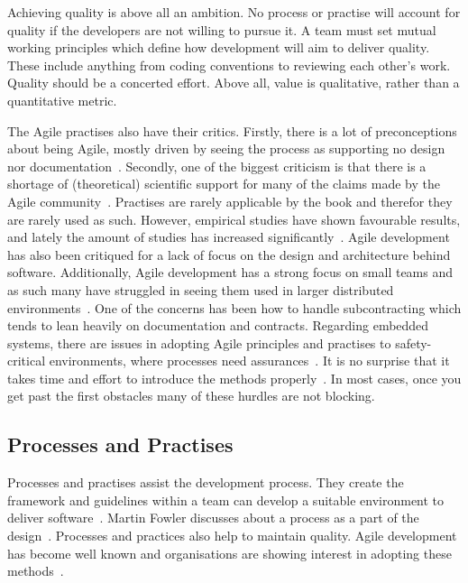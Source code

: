 \documentclass[english]{tktltiki2}
\begin{document}
Achieving quality is above all an ambition. No process or practise will account for quality if the developers are not willing to pursue it. A team must set mutual working principles which define how development will aim to deliver quality. These include anything from coding conventions to reviewing each other’s work. Quality should be a concerted effort. Above all, value is qualitative, rather than a quantitative metric.

The Agile practises also have their critics. Firstly, there is a lot of preconceptions about being Agile, mostly driven by seeing the process as supporting no design nor documentation~\cite{HMP12}. Secondly, one of the biggest criticism is that there is a shortage of (theoretical) scientific support for many of the claims made by the Agile community~\cite{DD08, DNB12}. Practises are rarely applicable by the book and therefor they are rarely used as such. However, empirical studies have shown favourable results, and lately the amount of studies has increased significantly~\cite{DD08, SS10, DNB12}. Agile development has also been critiqued for a lack of focus on the design and architecture behind software. Additionally, Agile development has a strong focus on small teams and as such many have struggled in seeing them used in larger distributed environments~\cite{TFR02}. One of the concerns has been how to handle subcontracting which tends to lean heavily on documentation and contracts. Regarding embedded systems, there are issues in adopting Agile principles and practises to safety-critical environments, where processes need assurances~\cite{TFR02}. It is no surprise that it takes time and effort to introduce the methods properly~\cite{DD08}. In most cases, once you get past the first obstacles many of these hurdles are not blocking.

\subsection{Processes and Practises}

Processes and practises assist the development process. They create the framework and guidelines within a team can develop a suitable environment to deliver software~\cite{Kni07}. Martin Fowler discusses about a process as a part of the design~\cite{Fow05}. Processes and practices also help to maintain quality. Agile development has become well known and organisations are showing interest in adopting these methods~\cite{DD08}.
\end{document}
